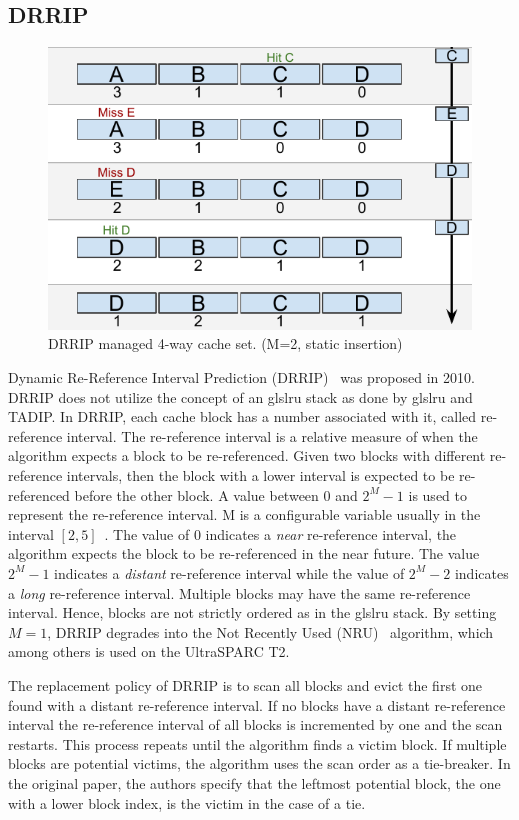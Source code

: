 \subsection{DRRIP}
\label{sec:algorithms:drrip}

\begin{figure}[ht]
    \centering
    \includegraphics[width=.65\textwidth]{figures/algorithms/DRRIP}
    \caption[DRRIP managed 4-way cache set.]{DRRIP managed 4-way cache set. (M=2, static insertion)}
    \label{fig:algorithms:drrip_example}
\end{figure}

Dynamic Re-Reference Interval Prediction (DRRIP)~\cite{Jaleel2010} was proposed in 2010.
DRRIP does not utilize the concept of an gls{lru} stack as done by gls{lru} and TADIP.
In DRRIP, each cache block has a number associated with it, called re-reference interval.
The re-reference interval is a relative measure of when the algorithm expects a block to be re-referenced.
Given two blocks with different re-reference intervals, then the block with a lower interval is expected to be re-referenced before the other block.
A value between 0 and $2^M - 1$ is used to represent the re-reference interval.
M is a configurable variable usually in the interval $[2, 5]$~\cite{Jaleel2010}.
The value of 0 indicates a \textit{near} re-reference interval, the algorithm expects the block to be re-referenced in the near future.
The value $2^M - 1$ indicates a \textit{distant} re-reference interval while the value of $2^M - 2$ indicates a \textit{long} re-reference interval.
Multiple blocks may have the same re-reference interval. 
Hence, blocks are not strictly ordered as in the gls{lru} stack.
By setting $M=1$, DRRIP degrades into the Not Recently Used (NRU)~\cite{Microsystems2007} algorithm, which among others is used on the UltraSPARC T2.

The replacement policy of DRRIP is to scan all blocks and evict the first one found with a distant re-reference interval.
If no blocks have a distant re-reference interval the re-reference interval of all blocks is incremented by one and the scan restarts.
This process repeats until the algorithm finds a victim block.
If multiple blocks are potential victims, the algorithm uses the scan order as a tie-breaker.
In the original paper, the authors specify that the leftmost potential block, the one with a lower block index, is the victim in the case of a tie.

